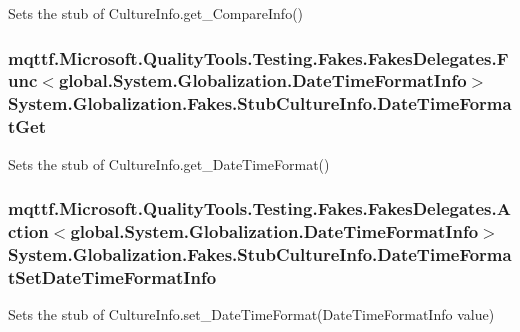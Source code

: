 Sets the stub of Culture\-Info.\-get\-\_\-\-Compare\-Info()

\hypertarget{class_system_1_1_globalization_1_1_fakes_1_1_stub_culture_info_a19262fe1d066da93657534b3887f7b95}{
\subsubsection[{Date\-Time\-Format\-Get}]{\setlength{\rightskip}{0pt plus 5cm}mqttf.\-Microsoft.\-Quality\-Tools.\-Testing.\-Fakes.\-Fakes\-Delegates.\-Func$<$global.\-System.\-Globalization.\-Date\-Time\-Format\-Info$>$ System.\-Globalization.\-Fakes.\-Stub\-Culture\-Info.\-Date\-Time\-Format\-Get}}\label{class_system_1_1_globalization_1_1_fakes_1_1_stub_culture_info_a19262fe1d066da93657534b3887f7b95}


Sets the stub of Culture\-Info.\-get\-\_\-\-Date\-Time\-Format()

\hypertarget{class_system_1_1_globalization_1_1_fakes_1_1_stub_culture_info_a1e408ad11285f333094ebf5a964f8446}{
\subsubsection[{Date\-Time\-Format\-Set\-Date\-Time\-Format\-Info}]{\setlength{\rightskip}{0pt plus 5cm}mqttf.\-Microsoft.\-Quality\-Tools.\-Testing.\-Fakes.\-Fakes\-Delegates.\-Action$<$global.\-System.\-Globalization.\-Date\-Time\-Format\-Info$>$ System.\-Globalization.\-Fakes.\-Stub\-Culture\-Info.\-Date\-Time\-Format\-Set\-Date\-Time\-Format\-Info}}\label{class_system_1_1_globalization_1_1_fakes_1_1_stub_culture_info_a1e408ad11285f333094ebf5a964f8446}


Sets the stub of Culture\-Info.\-set\-\_\-\-Date\-Time\-Format(\-Date\-Time\-Format\-Info value)

